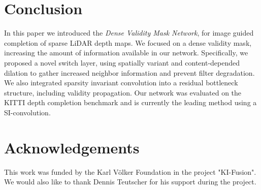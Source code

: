\documentclass[letterpaper, 10 pt, conference]{ieeeconf}  \usepackage{geometry}
\begin{document}
\section{Conclusion}
In this paper we introduced the \textit{Dense Validity Mask Network}, for image guided completion of sparse LiDAR depth maps. We focused on a dense validity mask, increasing the amount of information available in our network. Specifically, we proposed a novel switch layer, using spatially variant and content-depended dilation to gather increased neighbor information and prevent filter degradation. We also integrated sparsity invariant convolution into a residual bottleneck structure, including validity propagation. Our network was evaluated on the KITTI depth completion benchmark and is currently the leading method using a SI-convolution.

\section{Acknowledgements}
This work was funded by the Karl V\"olker Foundation in the project "KI-Fusion". We would also like to thank Dennis Teutscher for his support during the project.




\end{document}
